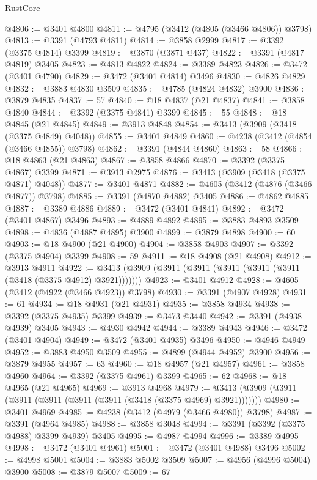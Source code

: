 \begin{lexlean}{RustCore}
\begin{coremodule}
@4806 := @3401 @4800
@4811 := @4795 (@3412 (@4805 (@3466 @4806)) @3798)
@4813 := @3391 (@4793 @4811)
@4814 := @3858 @2999
@4817 := @3392 (@3375 @4814) @3399
@4819 := @3870 (@3871 @437)
@4822 := @3391 (@4817 @4819) @3405
@4823 := @4813 @4822
@4824 := @3389 @4823
@4826 := @3472 (@3401 @4790)
@4829 := @3472 (@3401 @4814) @3496
@4830 := @4826 @4829
@4832 := @3883 @4830 @3509
@4835 := @4785 (@4824 @4832) @3900
@4836 := @3879 @4835
@4837 := 57
@4840 := @18 @4837 (@21 @4837)
@4841 := @3858 @4840
@4844 := @3392 (@3375 @4841) @3399
@4845 := 55
@4848 := @18 @4845 (@21 @4845)
@4849 := @3913 @4848
@4854 := @3413 (@3909 (@3418 (@3375 @4849) @4048))
@4855 := @3401 @4849
@4860 := @4238 (@3412 (@4854 (@3466 @4855)) @3798)
@4862 := @3391 (@4844 @4860)
@4863 := 58
@4866 := @18 @4863 (@21 @4863)
@4867 := @3858 @4866
@4870 := @3392 (@3375 @4867) @3399
@4871 := @3913 @2975
@4876 := @3413 (@3909 (@3418 (@3375 @4871) @4048))
@4877 := @3401 @4871
@4882 := @4605 (@3412 (@4876 (@3466 @4877)) @3798)
@4885 := @3391 (@4870 @4882) @3405
@4886 := @4862 @4885
@4887 := @3389 @4886
@4889 := @3472 (@3401 @4841)
@4892 := @3472 (@3401 @4867) @3496
@4893 := @4889 @4892
@4895 := @3883 @4893 @3509
@4898 := @4836 (@4887 @4895) @3900
@4899 := @3879 @4898
@4900 := 60
@4903 := @18 @4900 (@21 @4900)
@4904 := @3858 @4903
@4907 := @3392 (@3375 @4904) @3399
@4908 := 59
@4911 := @18 @4908 (@21 @4908)
@4912 := @3913 @4911
@4922 := @3413 (@3909 (@3911 (@3911 (@3911 (@3911 (@3911 (@3418 (@3375 @4912) @3921)))))))
@4923 := @3401 @4912
@4928 := @4605 (@3412 (@4922 (@3466 @4923)) @3798)
@4930 := @3391 (@4907 @4928)
@4931 := 61
@4934 := @18 @4931 (@21 @4931)
@4935 := @3858 @4934
@4938 := @3392 (@3375 @4935) @3399
@4939 := @3473 @3440
@4942 := @3391 (@4938 @4939) @3405
@4943 := @4930 @4942
@4944 := @3389 @4943
@4946 := @3472 (@3401 @4904)
@4949 := @3472 (@3401 @4935) @3496
@4950 := @4946 @4949
@4952 := @3883 @4950 @3509
@4955 := @4899 (@4944 @4952) @3900
@4956 := @3879 @4955
@4957 := 63
@4960 := @18 @4957 (@21 @4957)
@4961 := @3858 @4960
@4964 := @3392 (@3375 @4961) @3399
@4965 := 62
@4968 := @18 @4965 (@21 @4965)
@4969 := @3913 @4968
@4979 := @3413 (@3909 (@3911 (@3911 (@3911 (@3911 (@3911 (@3418 (@3375 @4969) @3921)))))))
@4980 := @3401 @4969
@4985 := @4238 (@3412 (@4979 (@3466 @4980)) @3798)
@4987 := @3391 (@4964 @4985)
@4988 := @3858 @3048
@4994 := @3391 (@3392 (@3375 @4988) @3399 @4939) @3405
@4995 := @4987 @4994
@4996 := @3389 @4995
@4998 := @3472 (@3401 @4961)
@5001 := @3472 (@3401 @4988) @3496
@5002 := @4998 @5001
@5004 := @3883 @5002 @3509
@5007 := @4956 (@4996 @5004) @3900
@5008 := @3879 @5007
@5009 := 67

\end{coremodule}
\end{lexlean}
